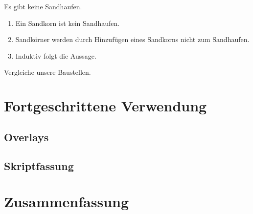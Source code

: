   \begin{frame}{\mythemename}{\mythemedescription}
    \begin{Satz}[Sandhaufensatz]
      Es gibt keine Sandhaufen.
    \end{Satz}

    \begin{Beweis}
      \begin{enumerate}
        \item Ein Sandkorn ist kein Sandhaufen.
        \item Sandkörner werden durch Hinzufügen
          eines Sandkorns nicht zum Sandhaufen.
        \item Induktiv folgt die Aussage. \qedhere
      \end{enumerate}
    \end{Beweis}

    \begin{Beispiel}
      Vergleiche unsere Baustellen.
    \end{Beispiel}
  \end{frame}

  \frame{}\frame{}

  \section{Fortgeschrittene Verwendung}

  \frame{}

  \subsection{Overlays}

  \frame{}\frame{}\frame{}\frame{}\frame{}\frame{}

  \subsection{Skriptfassung}

  \frame{}\frame{}\frame{}

  \section*{Zusammenfassung}

  \frame{}


